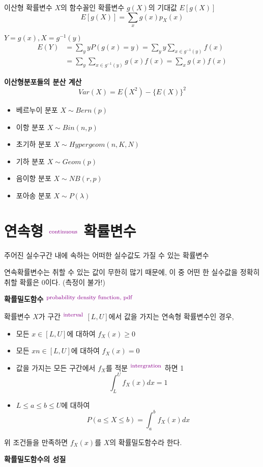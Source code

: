 \documentclass{oblivoir}
\newcommand{\DC}[1]{\textcolor{DarkMagenta}{#1}}%
\newcommand{\UP}[1]{$^{\mbox{\DC{\footnotesize #1}}}$}
\begin{document}
이산형 확률변수 $X$의 함수꼴인 확률변수 $g(X)$의 기대값 $E[g(X)]$
$$
E[g(X)] = \sum_x g(x)p_X(x) 
$$

$Y = g(x), X = g^{-1}(y)$
\begin{align*}
E(Y) &= \sum_y y P(g(x) = y) = \sum_y y \sum_{x \in g^{-1}(y)} f(x) \\
&= \sum_y \sum_{x \in g^{-1}(y)} g(x) f(x) = \sum_x g(x)f(x)
\end{align*}

\textbf{이산형분포들의 분산 계산}
$$
Var(X) = E(X^2) - \{E(X)\}^2
$$
\begin{itemize}
\item 베르누이 분포 $X \sim Bern(p)$
\item 이항 분포 $X \sim Bin(n,p)$
\item 초기하 분포 $X \sim Hypergeom(n, K, N)$
\item 기하 분포 $X \sim Geom(p)$
\item 음이항 분포 $X \sim NB(r,p)$
\item 포아송 분포 $X \sim P(\lambda)$
\end{itemize}

\section{연속형 \UP{continuous} 확률변수}

주어진 실수구간 내에 속하는 어떠한 실수값도 가질 수 있는 확률변수

연속확률변수는 취할 수 있는 값이 무한히 많기 때문에, 이 중 어떤 한 실수값을 정확히 취할 확률은 0이다. (측정이 불가!)

\textbf{확률밀도함수 \UP{probability density function, pdf}}

확률변수 $X$가 구간 \UP{interval} $[L, U]$에서 값을 가지는 연속형 확률변수인 경우,
\begin{itemize}
\item 모든 $x \in [L, U]$에 대하여 $f_X(x) \geq 0$
\item 모든 $x n\in [L, U]$에 대하여 $f_X(x) = 0$
\item 값을 가지는 모든 구간에서 $f_X$를 적분 \UP{intergration} 하면 1
$$
\int_L^U f_X(x) dx = 1
$$
\item $L \leq a \leq b \leq U$에 대하여
$$
P(a \leq X \leq b) = \int_a^b f_X(x) dx
$$
\end{itemize}

위 조건들을 만족하면 $f_X(x)$를 $X$의 확률밀도함수라 한다.

\textbf{확률밀도함수의 성질}
\end{document}
